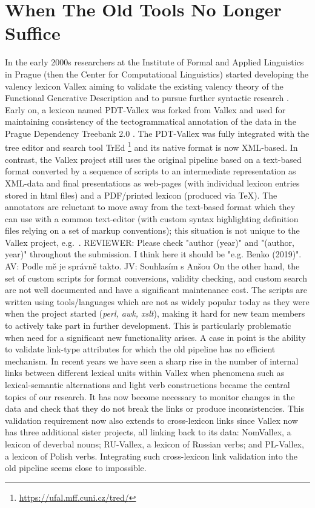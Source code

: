 \documentclass[10pt, a4paper]{article}
\newcommand{\av}[1]{{\color{ansa} AV: #1}}
\newcommand{\jv}[1]{{\color{svlinks} JV: #1}}
\newcommand{\rrr}[1]{{\color{red} REVIEWER: #1}}
\begin{document}
\section{When The Old Tools No Longer Suffice}\label{sec:history}
In the early 2000s researchers at the Institute of Formal and Applied Linguistics in Prague
(then the Center for Computational Linguistics) started developing the valency lexicon Vallex aiming to
validate the existing valency theory of the Functional Generative Description \cite{Panevova74verbal,Panevova75verbal,Panevova80formy,PanevovaSkoumalova92surface} and to pursue
further syntactic research \cite{LopatkovaEtAl02tektogramaticky}.
Early on, a lexicon named PDT-Vallex was forked from Vallex and used for
maintaining consistency of the tectogrammatical annotation of the data in the
Prague Dependency Treebank 2.0 \cite{PDT2.0,HajicHonetschlager03annotation}.
The PDT-Vallex was fully integrated with the tree editor and search tool TrEd%
\footnote{\url{https://ufal.mff.cuni.cz/tred/}}
\cite{PajasStepanek08recent}
and its native format is now XML-based.
In contrast, 
the Vallex project still uses the original pipeline based on a text-based format
converted by a sequence of scripts to an intermediate representation as XML-data
\cite{Zabokrtsky05valency}
and final presentations as web-pages (with individual lexicon entries stored in html files)
and a PDF/printed lexicon (produced via TeX).
The annotators are reluctant to move away from the text-based format which they can use with a common text-editor
(with custom syntax highlighting definition files relying on a set of markup conventions);
this situation is not unique to the Vallex project, e.g.\ \cite{Benko19LexiCorp}.
\rrr{Please check "author (year)" and "(author, year)" throughout the submission. I think here it should be "e.g. Benko (2019)".}
\av{Podle mě je správně takto.}
\jv{Souhlasím s Anšou}
On the other hand, the set of custom scripts for format conversions,
validity checking, and custom search are not well documented and have a significant
maintenance cost.
The scripts are written using tools/languages which are not as widely
popular today as they were when the project started (\emph{perl, awk, xslt}),
making it hard for new team members to actively take part in further development.
This is particularly problematic when need for a significant new functionality arises. A case in point
is the ability to validate link-type attributes for which the old pipeline has no efficient mechanism.
In recent years we have seen a sharp rise in the number of internal links between different lexical units within Vallex  when phenomena such as lexical-semantic alternations and light verb constructions became the central topics of our research. It has now become necessary to monitor changes in the data and check that they do not break the links or produce inconsistencies. This validation requirement now also extends to cross-lexicon links
since Vallex now has three additional sister projects, all linking back to its data: NomVallex, a lexicon of deverbal nouns; RU-Vallex, a lexicon of Russian verbs; and PL-Vallex, a lexicon of Polish verbs. Integrating such
cross-lexicon link validation into the old pipeline seems close to impossible.
\end{document}
